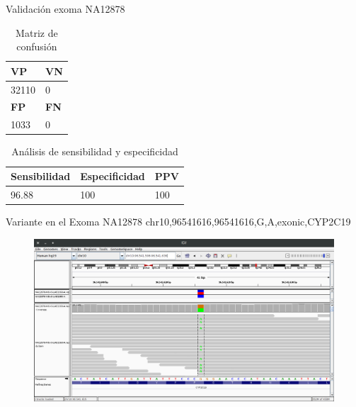 \documentclass[xcolor=dvipsnames]{beamer}
\begin{document}
\begin{frame}{Validación exoma NA12878}
    \begin{table}[H]
	    \begin{center}
		    \begin{tabular}{|l|l|}
			    \hline 
			    \textbf{VP} &  \textbf{VN} \\
			    \hline 
			    32110 & 0  \\ \hline
			    \textbf{FP} &  \textbf{FN} \\
			    \hline
			    1033 &  0\\ \hline
		    \end{tabular}
		\caption{Matriz de confusión}
		\label{tabla:tabla3}
	\end{center}
\end{table}


\begin{table}[H]
	\begin{center}
		\begin{tabular}{|l|l|l|}
			\hline 
			\textbf{Sensibilidad} & \textbf{Especificidad} & \textbf{PPV} \\
			\hline 
			96.88 & 100 & 100 \\ \hline
		\end{tabular}
		\caption{Análisis de sensibilidad y especificidad}
		\label{tabla:tabla4}
	\end{center}
\end{table}

\end{frame}

\begin{frame}{Variante en el Exoma NA12878}
	chr10,96541616,96541616,G,A,exonic,CYP2C19
\begin{figure}[]
	\includegraphics[width=1.02\textwidth]{IGV}
\end{figure}

\end{frame}
\end{document}
